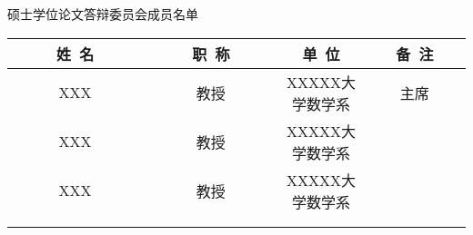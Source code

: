 \newpage
\thispagestyle{empty}
\vspace*{2em}

\begin{center}\STSong{}
 \underline{\makebox[4em][c]{\ccauthor}} 硕士学位论文答辩委员会成员名单
\end{center}

\begin{center}
\renewcommand{\arraystretch}{1.4}
  \begin{tabular}{|c|c|c|c|} \hline
   ~~~~~姓~名~~~~~ & ~~~~~职~称~~~~~ 
   & \hspace{6em}单~位\hspace{6em} & ~~~备~注~~~\\\hline
         XXX    &   教授    &  XXXXX大学数学系  & 主席  \\ \hline
         XXX    &   教授    &  XXXXX大学数学系  &       \\ \hline
         XXX    &   教授    &  XXXXX大学数学系  &       \\ \hline
                &           &                   &       \\ \hline
                &           &                   &       \\ \hline
  \end{tabular}
\end{center}
